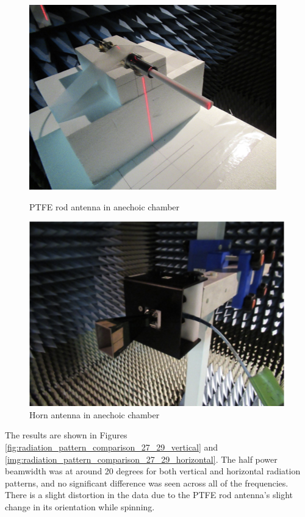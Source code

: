 \documentclass[a4paper,12pt]{report}
\begin{document}
\begin{figure}
  \centering
  \begin{minipage}{0.45\textwidth}
    \centering
    \includegraphics[clip, keepaspectratio, width=0.9\linewidth]{img/ptfe_rod_antenna_anechoic_chamber.png}
    \caption{PTFE rod antenna in anechoic chamber}
    \label{fig:ptfe_rod_antenna_anechoic_chamber} 
  \end{minipage}\hfill
  \begin{minipage}{0.45\textwidth}
    \centering
    \includegraphics[clip, keepaspectratio, width=0.9\linewidth]{img/horn_antenna_anechoic_chamber.png}
    \caption{Horn antenna in anechoic chamber}
    \label{img:horn_antenna_anechoic_chamber}
  \end{minipage}\hfill
\end{figure}

The results are shown in Figures
\ref{fig:radiation_pattern_comparison_27_29_vertical}
and \ref{img:radiation_pattern_comparison_27_29_horizontal}.
The half power beamwidth was at around 20 degrees for both
vertical and horizontal radiation patterns,
and no significant difference was seen across all of the frequencies.
There is a slight distortion in the data due to
the PTFE rod antenna's slight change in its orientation
while spinning.
\end{document}
